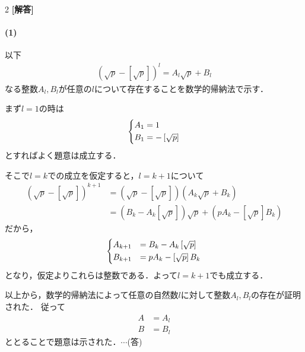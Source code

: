 \documentclass[../../main.tex]{subfiles}
\begin{document}
\setcounter{equation}{0}
\begin{oframed}
  
\end{oframed}
\setlength{\columnseprule}{0.4pt}
\begin{multicols}{2}
  {\bf [解答]}

  \paragraph{(1)}
  以下
  \begin{align}
    \left(\sqrt{p} - \left[\sqrt{p}\right]\right)^{l} = A_{l}\sqrt{p} + B_{l} \label{eq:1}
  \end{align}
  なる整数$A_{l},B_{l}$が任意の$l$について存在することを数学的帰納法で示す．

  まず$l=1$の時は
  \begin{align}
    \begin{dcases}
      A_1 = 1 \\
      B_1 = -\left[\sqrt{p}\right]
    \end{dcases} \label{eq:2}
  \end{align}
  とすればよく題意は成立する．

  そこで$l=k$での成立を仮定すると，$l=k+1$について
  \begin{align}
    \left(\sqrt{p} - \left[\sqrt{p}\right]\right)^{k+1}
    & = \left(\sqrt{p} - \left[\sqrt{p}\right]\right)\left(A_{k}\sqrt{p} + B_{k}\right)                    \\
    & = \left(B_{k}-A_{k}\left[\sqrt{p}\right]\right)\sqrt{p}+\left(pA_k-\left[\sqrt{p}\right]B_{k}\right)
  \end{align}
  だから，
  \begin{align}
    \begin{dcases}
      A_{k+1} & = B_{k}-A_{k}\left[\sqrt{p}\right] \\
      B_{k+1} & = pA_k-\left[\sqrt{p}\right]B_{k}
    \end{dcases} \label{eq:3}
  \end{align}
  となり，仮定よりこれらは整数である．よって$l=k+1$でも成立する．

  以上から，数学的帰納法によって任意の自然数$l$に対して整数$A_{l},B_{l}$の存在が証明された．
  従って
  \begin{align}
    A & = A_{l} \\
    B & = B_{l}
  \end{align}
  ととることで題意は示された．$\cdots$(答)


\end{multicols}
\end{document}
